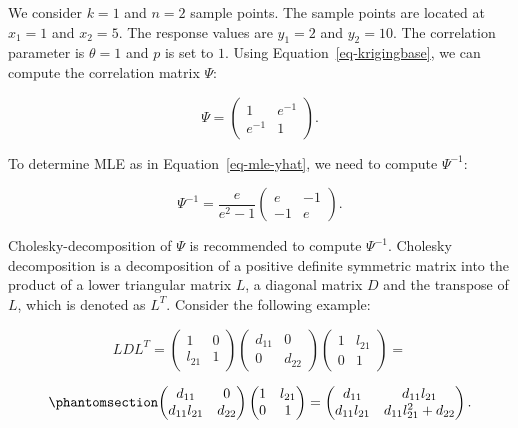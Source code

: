 \documentclass[
  letterpaper,
  DIV=11,
  numbers=noendperiod]{scrreprt}
\begin{document}
We consider \(k=1\) and \(n=2\) sample points. The sample points are
located at \(x_1=1\) and \(x_2=5\). The response values are \(y_1=2\)
and \(y_2=10\). The correlation parameter is \(\theta=1\) and \(p\) is
set to \(1\). Using Equation~\ref{eq-krigingbase}, we can compute the
correlation matrix \(\Psi\):

\[
\Psi = \begin{pmatrix}
1 & e^{-1}\\
e^{-1} & 1
\end{pmatrix}.
\]

To determine MLE as in Equation~\ref{eq-mle-yhat}, we need to compute
\(\Psi^{-1}\):

\[
\Psi^{-1} = \frac{e}{e^2 -1} \begin{pmatrix}
e & -1\\
-1 & e
\end{pmatrix}.
\]

Cholesky-decomposition of \(\Psi\) is recommended to compute
\(\Psi^{-1}\). Cholesky decomposition is a decomposition of a positive
definite symmetric matrix into the product of a lower triangular matrix
\(L\), a diagonal matrix \(D\) and the transpose of \(L\), which is
denoted as \(L^T\). Consider the following example:

\[
LDL^T=
\begin{pmatrix}
1 & 0 \\
l_{21} & 1
\end{pmatrix}
\begin{pmatrix}
d_{11} & 0 \\
0 & d_{22}
\end{pmatrix}
\begin{pmatrix}
1 & l_{21} \\
0 & 1
\end{pmatrix}=
\]

\begin{equation}\phantomsection\label{eq-cholex}{
\begin{pmatrix}
d_{11} & 0 \\
d_{11} l_{21} & d_{22}
\end{pmatrix}
\begin{pmatrix}
1 & l_{21} \\
0 & 1
\end{pmatrix}
=
\begin{pmatrix}
d_{11} & d_{11} l_{21} \\
d_{11} l_{21} & d_{11} l_{21}^2 + d_{22}
\end{pmatrix}.
}\end{equation}
\end{document}
